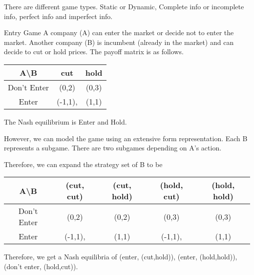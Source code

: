 \newsection
There are different game types. Static or Dynamic, Complete info or incomplete info, perfect info and imperfect info.

\begin{aexample}{Entry Game}{}
    A company (A) can enter the market or decide not to enter the market. Another company (B) is incumbent (already in the market) and can decide to cut or hold prices. The payoff matrix is as follows.
    \begin{center}
        \begin{tabular}{|c|c c|}
            \hline
            A\textbackslash B & cut & hold\\
            \hline
            Don't Enter & (0,2) & (0,3)   \\
            \hline Enter & (-1,1),& (1,1) \\  \hline  
        \end{tabular}
    \end{center}
    The Nash equilibrium is Enter and Hold.
\end{aexample}
However, we can model the game using an extensive form representation. Each B represents a subgame. There are two subgames depending on A's action.
\begin{center}
\end{center}
Therefore, we can expand the strategy set of B to be 
\begin{center}
    \begin{tabular}{|c|c c c c|}
        \hline
        A\textbackslash B & (cut, cut) & (cut, hold) &(hold, cut) & (hold, hold) \\
        \hline
        Don't Enter & (0,2) &(0,2)&(0,3)& (0,3)   \\
        \hline Enter & (-1,1),& (1,1)  & (-1,1),& (1,1) \\  \hline  
    \end{tabular}
\end{center}
Therefore, we get a Nash equilibria of (enter, (cut,hold)), (enter, (hold,hold)), (don't enter, (hold,cut)).

